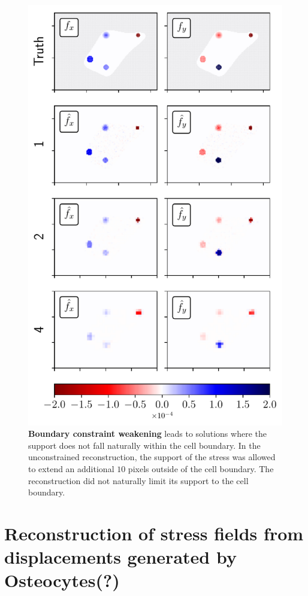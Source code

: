 \documentclass[aps,prl,reprint,twocolumn,groupedaddress,showpacs]{revtex4}
\begin{document}
\begin{figure}
\includegraphics[width=\linewidth]{fig4}
\caption{\textbf{Boundary constraint weakening} leads to solutions
  where the support does not fall naturally within the cell
  boundary. In the unconstrained reconstruction, the support of the
  stress was allowed to extend an additional $10$ pixels outside of
  the cell boundary. The reconstruction did not naturally limit its
  support to the cell boundary.}
\label{fig:fig4}
\end{figure}



\section{Reconstruction of stress fields from displacements 
generated by Osteocytes(?)}
\end{document}

